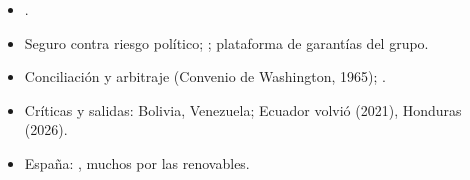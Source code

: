 \documentclass{article}
\begin{document}
\begin{columnas}
\begin{itemize}
\item {}.
\end{itemize}
\begin{itemize}
\item Seguro contra riesgo político; ; plataforma de garantías del grupo.
\end{itemize}
\begin{itemize}
\item Conciliación y arbitraje (Convenio de Washington, 1965); .
\item Críticas y salidas: Bolivia, Venezuela; Ecuador volvió (2021), Honduras (2026).
\item España: , muchos por las renovables.
\end{itemize}


\end{columnas}
\end{document}
